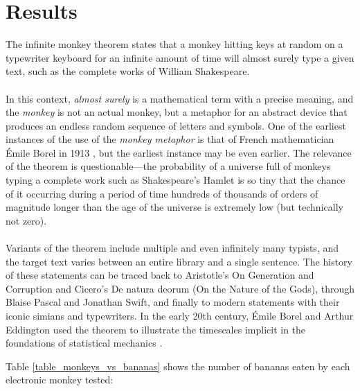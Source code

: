 \chapter{Results} \label{results}

The infinite monkey theorem states that a monkey hitting keys at random on a typewriter keyboard for an infinite amount of time will almost surely type a given text, such as the complete works of William Shakespeare.
\\
\\
In this context, \textit{almost surely} is a mathematical term with a precise meaning, and the \textit{monkey} is not an actual monkey, but a metaphor for an abstract device that produces an endless random sequence of letters and symbols. One of the earliest instances of the use of the \textit{monkey metaphor} is that of French mathematician Émile Borel in 1913 \cite{borel1913mecanique}, but the earliest instance may be even earlier. The relevance of the theorem is questionable—the probability of a universe full of monkeys typing a complete work such as Shakespeare's Hamlet is so tiny that the chance of it occurring during a period of time hundreds of thousands of orders of magnitude longer than the age of the universe is extremely low (but technically not zero).
\\
\\
Variants of the theorem include multiple and even infinitely many typists, and the target text varies between an entire library and a single sentence. The history of these statements can be traced back to Aristotle's On Generation and Corruption and Cicero's De natura deorum (On the Nature of the Gods), through Blaise Pascal and Jonathan Swift, and finally to modern statements with their iconic simians and typewriters. In the early 20th century, Émile Borel and Arthur Eddington used the theorem to illustrate the timescales implicit in the foundations of statistical mechanics \cite{wikiMonkeys}.

\newpage
Table \ref{table_monkeys_vs_bananas} shows the number of bananas eaten by each electronic monkey tested:


